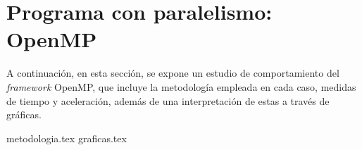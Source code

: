 \part{Programa con paralelismo: OpenMP}

A continuación, en esta sección, se expone un estudio de comportamiento del \textit{framework} OpenMP, que incluye la metodología empleada en cada caso, medidas de tiempo y aceleración, además de una interpretación de estas a través de gráficas. 

{metodologia.tex}
{graficas.tex}
